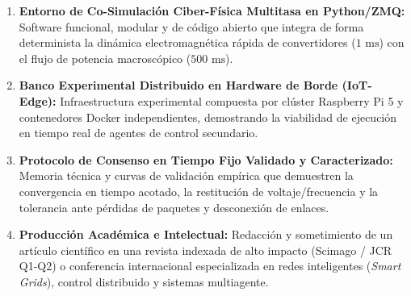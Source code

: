 \begin{enumerate}
    \item \textbf{Entorno de Co-Simulación Ciber-Física Multitasa en Python/ZMQ:} Software funcional, modular y de código abierto que integra de forma determinista la dinámica electromagnética rápida de convertidores ($1\text{ ms}$) con el flujo de potencia macroscópico ($500\text{ ms}$).
    \item \textbf{Banco Experimental Distribuido en Hardware de Borde (IoT-Edge):} Infraestructura experimental compuesta por clúster Raspberry Pi 5 y contenedores Docker independientes, demostrando la viabilidad de ejecución en tiempo real de agentes de control secundario.
    \item \textbf{Protocolo de Consenso en Tiempo Fijo Validado y Caracterizado:} Memoria técnica y curvas de validación empírica que demuestren la convergencia en tiempo acotado, la restitución de voltaje/frecuencia y la tolerancia ante pérdidas de paquetes y desconexión de enlaces.
    \item \textbf{Producción Académica e Intelectual:} Redacción y sometimiento de un artículo científico en una revista indexada de alto impacto (Scimago / JCR Q1-Q2) o conferencia internacional especializada en redes inteligentes (\textit{Smart Grids}), control distribuido y sistemas multiagente.
\end{enumerate}